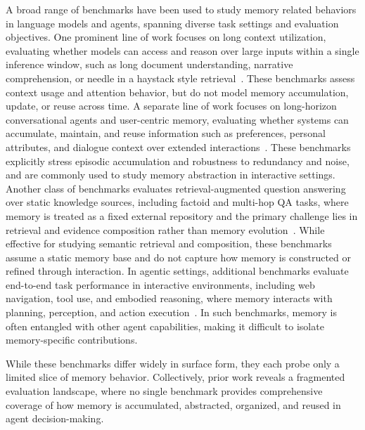 A broad range of benchmarks have been used to study memory related behaviors in language models and agents, spanning diverse task settings and evaluation objectives. One prominent line of work focuses on long context utilization, evaluating whether models can access and reason over large inputs within a single inference window, such as long document understanding, narrative comprehension, or needle in a haystack style retrieval~\citep{liu2023lostmiddlelanguagemodels,bai2024longbenchbilingualmultitaskbenchmark,zhang2024inftybenchextendinglongcontext}. These benchmarks assess context usage and attention behavior, but do not model memory accumulation, update, or reuse across time.
A separate line of work focuses on long-horizon conversational agents and user-centric memory, evaluating whether systems can accumulate, maintain, and reuse information such as preferences, personal attributes, and dialogue context over extended interactions~\citep{wu2024longmemeval,maharana2024evaluatinglongtermconversationalmemory}. These benchmarks explicitly stress episodic accumulation and robustness to redundancy and noise, and are commonly used to study memory abstraction in interactive settings.
Another class of benchmarks evaluates retrieval-augmented question answering over static knowledge sources, including factoid and multi-hop QA tasks, where memory is treated as a fixed external repository and the primary challenge lies in retrieval and evidence composition rather than memory evolution~\citep{petroni2021kiltbenchmarkknowledgeintensive,kwiatkowski-etal-2019-natural,yang2018hotpotqadatasetdiverseexplainable,trivedi2022musiquemultihopquestionssinglehop}. While effective for studying semantic retrieval and composition, these benchmarks assume a static memory base and do not capture how memory is constructed or refined through interaction.
In agentic settings, additional benchmarks evaluate end-to-end task performance in interactive environments, including web navigation, tool use, and embodied reasoning, where memory interacts with planning, perception, and action execution~\citep{zhou2024webarenarealisticwebenvironment,trivedi2024appworldcontrollableworldapps,furuta2024multimodalwebnavigationinstructionfinetuned,shridhar2021alfworldaligningtextembodied,liu2025agentbenchevaluatingllmsagents}. In such benchmarks, memory is often entangled with other agent capabilities, making it difficult to isolate memory-specific contributions.

While these benchmarks differ widely in surface form, they each probe only a limited slice of memory behavior. Collectively, prior work reveals a fragmented evaluation landscape, where no single benchmark provides comprehensive coverage of how memory is accumulated, abstracted, organized, and reused in agent decision-making.

